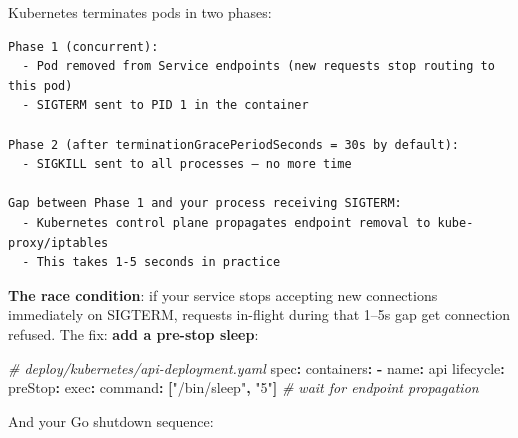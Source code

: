 \documentclass[
]{article}
\newenvironment{Shaded}{}{}
\newcommand{\AttributeTok}[1]{\textcolor[rgb]{0.49,0.56,0.16}{#1}}
\newcommand{\CommentTok}[1]{\textcolor[rgb]{0.38,0.63,0.69}{\textit{#1}}}
\newcommand{\FunctionTok}[1]{\textcolor[rgb]{0.02,0.16,0.49}{#1}}
\newcommand{\KeywordTok}[1]{\textcolor[rgb]{0.00,0.44,0.13}{\textbf{#1}}}
\newcommand{\StringTok}[1]{\textcolor[rgb]{0.25,0.44,0.63}{#1}}
\begin{document}
Kubernetes terminates pods in two phases:

\begin{verbatim}
Phase 1 (concurrent):
  - Pod removed from Service endpoints (new requests stop routing to this pod)
  - SIGTERM sent to PID 1 in the container

Phase 2 (after terminationGracePeriodSeconds = 30s by default):
  - SIGKILL sent to all processes — no more time

Gap between Phase 1 and your process receiving SIGTERM:
  - Kubernetes control plane propagates endpoint removal to kube-proxy/iptables
  - This takes 1-5 seconds in practice
\end{verbatim}

\textbf{The race condition}: if your service stops accepting new
connections immediately on SIGTERM, requests in-flight during that 1--5s
gap get connection refused. The fix: \textbf{add a pre-stop sleep}:

\begin{Shaded}
\begin{Highlighting}[]
\CommentTok{\# deploy/kubernetes/api{-}deployment.yaml}
\FunctionTok{spec}\KeywordTok{:}
\AttributeTok{  }\FunctionTok{containers}\KeywordTok{:}
\AttributeTok{  }\KeywordTok{{-}}\AttributeTok{ }\FunctionTok{name}\KeywordTok{:}\AttributeTok{ api}
\AttributeTok{    }\FunctionTok{lifecycle}\KeywordTok{:}
\AttributeTok{      }\FunctionTok{preStop}\KeywordTok{:}
\AttributeTok{        }\FunctionTok{exec}\KeywordTok{:}
\AttributeTok{          }\FunctionTok{command}\KeywordTok{:}\AttributeTok{ }\KeywordTok{[}\StringTok{"/bin/sleep"}\KeywordTok{,}\AttributeTok{ }\StringTok{"5"}\KeywordTok{]}\CommentTok{  \# wait for endpoint propagation}
\end{Highlighting}
\end{Shaded}

And your Go shutdown sequence:
\end{document}
